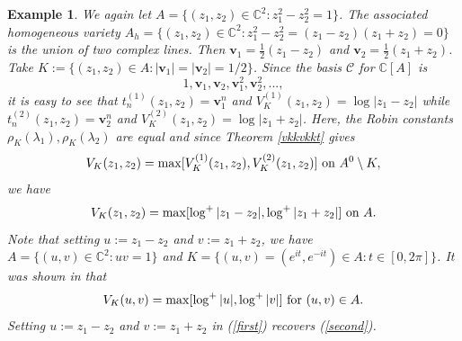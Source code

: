 \documentclass[12pt]{article}
\numberwithin{equation}{section}
\newtheorem{Example}[theorem]{Example}
\newenvironment{example}{\begin{Example}\rm}{\end{Example}}
\newcommand{\C}{\mathbb{C}}
\newcommand{\calC}{\mathcal{C}}
\newcommand{\bv}{\mathbf{v}}
\begin{document}
\begin{example} \label{twotwo} We again let $A=\{(z_1,z_2)\in \C^2: z_1^2 -z_2^2 =1\}$. The associated homogeneous variety $A_h=\{(z_1,z_2)\in \C^2: z_1^2 -z_2^2 =(z_1 -z_2)(z_1+z_2)=0\}$ is the union of two complex lines. Then $\bv_1= \frac{1}{2}(z_1-z_2)$ and $\bv_2= \frac{1}{2}(z_1+z_2)$. Take 
$K:=\{(z_1,z_2)\in A: |\bv_1|=|\bv_2|=1/2\}$. Since the basis $\calC$ for $\C[A]$ is 
$$1,\bv_1, \bv_2,\bv_1^2, \bv_2^2,...,$$
it is easy to see that $t_n^{(1)}(z_1,z_2)= \bv_1^n$ and $V_{K}^{(1)}(z_1,z_2)=\log |z_1-z_2|$ while $t_n^{(2)}(z_1,z_2)= \bv_2^n$ and $V_{K}^{(2)}(z_1,z_2)=\log |z_1+z_2|$. Here, the Robin constants $\rho_K(\lambda_1), \rho_K(\lambda_2)$ are equal and since Theorem \ref{vkkvkkt} gives
$$V_K(z_1,z_2)= \max[V_{K}^{(1)}(z_1,z_2), V_{K}^{(2)}(z_1,z_2)] \ \hbox{on} \ A^0 \setminus K,$$
we have
\begin{equation}\label{first} V_K(z_1,z_2)=\max[\log^+|z_1-z_2|,\log^+|z_1+z_2|] \ \hbox{on} \ A. \end{equation}
Note that setting $u:=z_1-z_2$ and $v:=z_1+z_2$, we have $A = \{(u,v)\in \C^2: uv = 1\}$ and $K=\{(u,v)=(e^{it}, e^{-it})\in A: t\in [0,2\pi]\}$. 
It was shown in \cite{BL} that 
\begin{equation}\label{second} V_K(u,v)=\max[ \log^+|u|, \log^+|v|]\ \hbox{for} \ (u,v)\in A. \end{equation}
 Setting $u:=z_1-z_2$ and $v:=z_1+z_2$ in (\ref{first}) recovers (\ref{second}).


\end{example}
\end{document}
